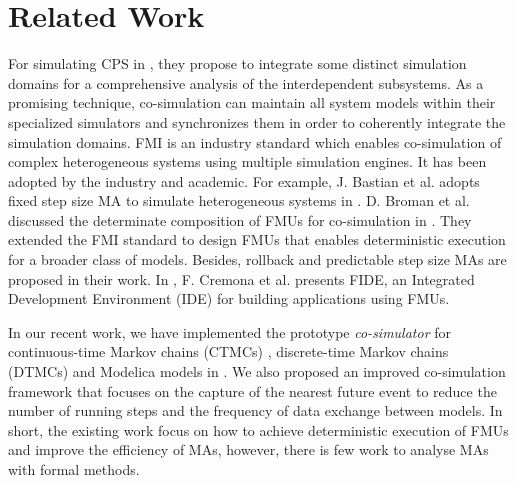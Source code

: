 \section{Related Work}
\label{sec:relateworks}
For simulating CPS in \cite{GeorgMRW14}, they propose to integrate some distinct simulation domains for a comprehensive analysis of the interdependent subsystems. As a promising technique, co-simulation \cite{Bogomolov2015Co} can maintain all system models within their specialized simulators and synchronizes them in order to coherently integrate the simulation domains. FMI \cite{Blochwitz2011The}\cite{FMI2INTRO} is an industry standard which enables co-simulation of complex heterogeneous systems using multiple simulation engines. It has been adopted by the industry and academic. For example, J. Bastian et al. adopts fixed step size MA to simulate heterogeneous systems in \cite{Bastian2011Master}.
D. Broman et al. discussed the determinate composition of FMUs for co-simulation in \cite{BromanBGLMTW13}. They extended the FMI standard to design FMUs that enables deterministic execution for a broader class of models. Besides, rollback and predictable step size MAs are proposed in their work. In \cite{CremonaLTBL16}, F. Cremona et al. presents FIDE, an Integrated Development Environment (IDE) for building applications using FMUs. 

In our recent work, we have implemented the prototype \textit{co-simulator} for continuous-time Markov chains (CTMCs) \cite{DanosHGS17}, discrete-time Markov chains (DTMCs) \cite{Guerry13} and Modelica models in \cite{LiuJWCD16}. We also proposed an improved co-simulation framework that focuses on the capture of the nearest future event to reduce the number of running steps and the frequency of data exchange between models. In short, the existing work focus on how to achieve deterministic execution of FMUs and improve the efficiency of MAs, however, there is few work to analyse MAs with formal methods.

